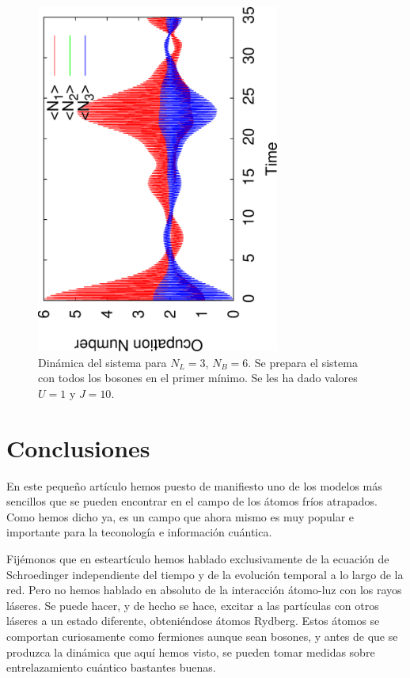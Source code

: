 \documentclass[11pt,a4paper]{article}
\begin{document}
\begin{figure}[h]
  \centering
  \includegraphics[width=8cm,angle=270]{Prop_600_NL3_NB6_U1_J10.eps}
  \caption{Dinámica del sistema para $N_L=3$, $N_B=6$. Se prepara el sistema con todos los bosones en el primer mínimo. Se les ha dado valores $U=1$ y $J=10$.}
  \label{f:dinamica}
\end{figure}
\noindent


\section{Conclusiones}

En este  pequeño artículo hemos puesto de manifiesto uno de los modelos más sencillos que se pueden encontrar en el campo de los átomos fríos atrapados. Como hemos dicho ya, es un campo que ahora mismo es muy popular e importante para la teconología e información cuántica.

Fijémonos que en esteartículo hemos hablado exclusivamente de la ecuación de Schroedinger independiente del tiempo y de la evolución temporal a lo largo de la red. Pero no hemos hablado en absoluto de la interacción átomo-luz con los rayos láseres. Se puede hacer, y de hecho se hace, excitar a las partículas con otros láseres a un estado diferente, obteniéndose átomos Rydberg. Estos átomos se comportan curiosamente como fermiones aunque sean bosones, y antes de que se produzca la dinámica que aquí hemos visto, se pueden tomar medidas sobre entrelazamiento cuántico bastantes buenas.
\end{document}

